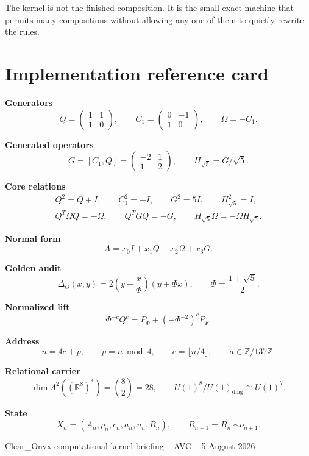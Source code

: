 \documentclass[11pt,letterpaper]{article}
\theoremstyle{clearonyx}
\newcommand{\R}{\mathbb{R}}
\newcommand{\Z}{\mathbb{Z}}
\newcommand{\diag}{\mathrm{diag}}
\newcommand{\Append}{\mathbin{\frown}}
\begin{document}
The kernel is not the finished composition.  It is the small exact machine that permits many compositions without allowing any one of them to quietly rewrite the rules.

\clearpage
\section*{Implementation reference card}

\begin{executivebox}
\textbf{Generators}
\begin{equation*}
Q=\begin{pmatrix}1&1\\1&0\end{pmatrix},
\qquad
C_1=\begin{pmatrix}0&-1\\1&0\end{pmatrix},
\qquad
\Omega=-C_1.
\end{equation*}

\textbf{Generated operators}
\begin{equation*}
G=[C_1,Q]=\begin{pmatrix}-2&1\\1&2\end{pmatrix},
\qquad
H_{\sqrt5}=G/\sqrt5.
\end{equation*}

\textbf{Core relations}
\begin{gather*}
Q^2=Q+I,
\qquad
C_1^2=-I,
\qquad
G^2=5I,
\qquad
H_{\sqrt5}^2=I,\\
Q^T\Omega Q=-\Omega,
\qquad
Q^TGQ=-G,
\qquad
H_{\sqrt5}\Omega=-\Omega H_{\sqrt5}.
\end{gather*}

\textbf{Normal form}
\begin{equation*}
A=x_0I+x_1Q+x_2\Omega+x_3G.
\end{equation*}

\textbf{Golden audit}
\begin{equation*}
\Delta_G(x,y)=2\left(y-\frac{x}{\Phi}\right)(y+\Phi x),
\qquad
\Phi=\frac{1+\sqrt5}{2}.
\end{equation*}

\textbf{Normalized lift}
\begin{equation*}
\Phi^{-c}Q^c=P_\Phi+(-\Phi^{-2})^cP_\Psi.
\end{equation*}

\textbf{Address}
\begin{equation*}
n=4c+p,
\qquad
p=n\bmod4,
\qquad
c=\lfloor n/4\rfloor,
\qquad
a\in\Z/137\Z.
\end{equation*}

\textbf{Relational carrier}
\begin{equation*}
\dim\Lambda^2((\R^8)^*)=\binom82=28,
\qquad
U(1)^8/U(1)_{\diag}\cong U(1)^7.
\end{equation*}

\textbf{State}
\begin{equation*}
X_n=(A_n,p_n,c_n,a_n,u_n,R_n),
\qquad
R_{n+1}=R_n\Append o_{n+1}.
\end{equation*}
\end{executivebox}

\vfill
\begin{center}
\small\color{graphite}
Clear\_Onyx computational kernel briefing -- AVC -- 5 August 2026
\end{center}
\end{document}
